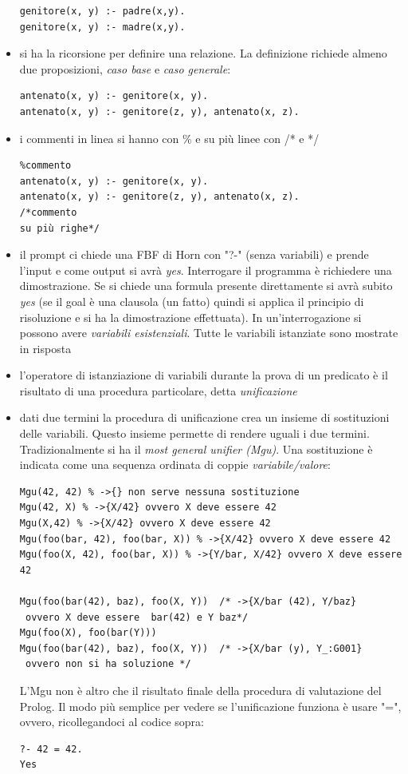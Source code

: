 \documentclass[a4paper,12pt, oneside]{book}
\begin{document}
\begin{itemize}
\begin{verbatim}
genitore(x, y) :- padre(x,y).
genitore(x, y) :- madre(x,y).
\end{verbatim}
\item si ha la ricorsione per definire una relazione. La definizione richiede almeno due proposizioni, \textit{caso base} e \textit{caso generale}:
\begin{verbatim}
antenato(x, y) :- genitore(x, y).
antenato(x, y) :- genitore(z, y), antenato(x, z).
\end{verbatim}
\item i commenti in linea si hanno con \% e su più linee con /* e */
\begin{verbatim}
%commento
antenato(x, y) :- genitore(x, y).
antenato(x, y) :- genitore(z, y), antenato(x, z).
/*commento
su più righe*/
\end{verbatim}
\item il prompt ci chiede una FBF di Horn con "?-" (senza variabili) e prende l'input e come output si avrà \textit{yes}. Interrogare il programma è richiedere una dimostrazione. Se si chiede una formula presente direttamente si avrà subito \textit{yes} (se il goal è una clausola (un fatto) quindi si applica il principio di risoluzione e si ha la dimostrazione effettuata). In un'interrogazione si possono avere \textit{variabili esistenziali}. Tutte le variabili istanziate sono mostrate in risposta
\item l'operatore di istanziazione di variabili durante la prova di un predicato è il risultato di una procedura particolare, detta \textit{unificazione}
\item dati due termini la procedura di unificazione crea un insieme di sostituzioni delle variabili. Questo insieme permette di rendere uguali i due termini. Tradizionalmente si ha il \textit{most general unifier (Mgu)}. Una sostituzione è indicata come una sequenza ordinata di coppie \textit{variabile/valore}:
\begin{verbatim}
Mgu(42, 42) % ->{} non serve nessuna sostituzione
Mgu(42, X) % ->{X/42} ovvero X deve essere 42
Mgu(X,42) % ->{X/42} ovvero X deve essere 42
Mgu(foo(bar, 42), foo(bar, X)) % ->{X/42} ovvero X deve essere 42
Mgu(foo(X, 42), foo(bar, X)) % ->{Y/bar, X/42} ovvero X deve essere 42

Mgu(foo(bar(42), baz), foo(X, Y))  /* ->{X/bar (42), Y/baz}
 ovvero X deve essere  bar(42) e Y baz*/
Mgu(foo(X), foo(bar(Y))) 
Mgu(foo(bar(42), baz), foo(X, Y))  /* ->{X/bar (y), Y_:G001}
 ovvero non si ha soluzione */
\end{verbatim}
L'Mgu non è altro che il risultato finale della procedura di valutazione del Prolog. Il modo più semplice per vedere se l'unificazione funziona è usare "=", ovvero, ricollegandoci al codice sopra:
\begin{verbatim}
?- 42 = 42.
Yes


\end{verbatim}
\end{itemize}
\end{document}
